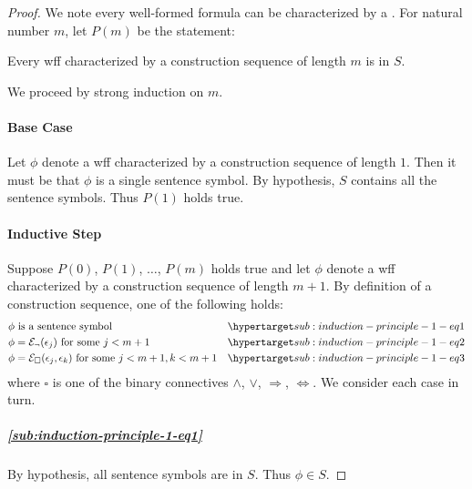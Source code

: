 \documentclass{report}
\begin{document}
  \begin{proof}

    We note every well-formed formula can be characterized by a
      .
    For natural number $m$, let $P(m)$ be the statement:
      \begin{induction}
        Every wff characterized by a construction sequence of length $m$ is in
          $S$.
      \end{induction}
    \noindent
    We proceed by strong induction on $m$.

    \paragraph{Base Case}%

      Let $\phi$ denote a wff characterized by a construction sequence of length
        $1$.
      Then it must be that $\phi$ is a single sentence symbol.
      By hypothesis, $S$ contains all the sentence symbols.
      Thus $P(1)$ holds true.

    \paragraph{Inductive Step}%

      Suppose $P(0)$, $P(1)$, $\ldots$, $P(m)$ holds true and let $\phi$ denote
        a wff characterized by a construction sequence of length $m + 1$.
      By definition of a construction sequence, one of the following holds:
        \begin{align}
          & \phi \text{ is a sentence symbol}
            & \hyperlabel{sub:induction-principle-1-eq1} \\
          & \phi = \mathcal{E}_\neg(\epsilon_j)
            \text{ for some } j < m + 1
            & \hyperlabel{sub:induction-principle-1-eq2} \\
          & \phi = \mathcal{E}_\square(\epsilon_j, \epsilon_k)
            \text{ for some } j < m + 1, k < m + 1
            & \hyperlabel{sub:induction-principle-1-eq3}
        \end{align}
        where $\square$ is one of the binary connectives $\land$, $\lor$,
          $\Rightarrow$, $\Leftrightarrow$.
      We consider each case in turn.

      \subparagraph{\eqref{sub:induction-principle-1-eq1}}%

        By hypothesis, all sentence symbols are in $S$.
        Thus $\phi \in S$.


\end{proof}
\end{document}
